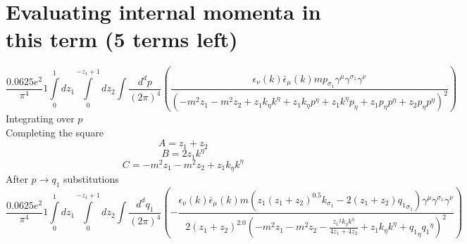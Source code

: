 \section*{Evaluating internal momenta in this term (5 terms left)}
\begin{dmath}\frac{0.0625 e^{2}}{\pi^{4}}1\int\limits_{ 0 }^{ 1 } d{ z_{ 1 } }\int\limits_{ 0 }^{ - { z_{ 1 } } + 1 } d{ z_{ 2 } }\int\frac{d^d p }{ (2\pi)^4 }\left(\frac{\epsilon_{ \nu }({ k }) \bar{\epsilon}_{ \mu }({ k }) m { { p }_{ \sigma_1 } } { \gamma^{ \mu } } { \gamma^{ \sigma_1 } } { \gamma^{ \nu } }}{\left(- m^{2} { z_{ 1 } } - m^{2} { z_{ 2 } } + { z_{ 1 } } { { k }_{ \eta } } { { k }^{ \eta } } + { z_{ 1 } } { { k }_{ \eta } } { { p }^{ \eta } } + { z_{ 1 } } { { k }^{ \eta } } { { p }_{ \eta } } + { z_{ 1 } } { { p }_{ \eta } } { { p }^{ \eta } } + { z_{ 2 } } { { p }_{ \eta } } { { p }^{ \eta } }\right)^{2}}\right)\end{dmath}
Integrating over $p$\\
Completing the square\
\begin{dmath}A = { z_{ 1 } } + { z_{ 2 } }\end{dmath}
\begin{dmath}B = 2 { z_{ 1 } } { { k }^{ \eta } }\end{dmath}
\begin{dmath}C = - m^{2} { z_{ 1 } } - m^{2} { z_{ 2 } } + { z_{ 1 } } { { k }_{ \eta } } { { k }^{ \eta } }\end{dmath}
After $p \to q_1$ substitutions
\begin{dmath}\frac{0.0625 e^{2}}{\pi^{4}}1\int\limits_{ 0 }^{ 1 } d{ z_{ 1 } }\int\limits_{ 0 }^{ - { z_{ 1 } } + 1 } d{ z_{ 2 } }\int\frac{d^d q_1 }{ (2\pi)^4 }\left(- \frac{\epsilon_{ \nu }({ k }) \bar{\epsilon}_{ \mu }({ k }) m \left({ z_{ 1 } } \left({ z_{ 1 } } + { z_{ 2 } }\right)^{0.5} { { k }_{ \sigma_1 } } - 2 \left({ z_{ 1 } } + { z_{ 2 } }\right) { { q_1 }_{ \sigma_1 } }\right) { \gamma^{ \mu } } { \gamma^{ \sigma_1 } } { \gamma^{ \nu } }}{2 \left({ z_{ 1 } } + { z_{ 2 } }\right)^{2.0} \left(- m^{2} { z_{ 1 } } - m^{2} { z_{ 2 } } - \frac{{ z_{ 1 } }^{2} { { k }_{ \eta } } { { k }^{ \eta } }}{4 { z_{ 1 } } + 4 { z_{ 2 } }} + { z_{ 1 } } { { k }_{ \eta } } { { k }^{ \eta } } + { { q_1 }_{ \eta } } { { q_1 }^{ \eta } }\right)^{2}}\right)\end{dmath}
